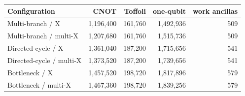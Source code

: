 \begin{tabular}{lrrrr}
\toprule
Configuration & CNOT & Toffoli & one-qubit & work ancillas \\
\midrule
Multi-branch / X & 1{,}196{,}400 & 161{,}760 & 1{,}492{,}936 & 509 \\
Multi-branch / multi-X & 1{,}207{,}680 & 161{,}760 & 1{,}515{,}736 & 509 \\
Directed-cycle / X & 1{,}361{,}040 & 187{,}200 & 1{,}715{,}656 & 541 \\
Directed-cycle / multi-X & 1{,}373{,}520 & 187{,}200 & 1{,}739{,}656 & 541 \\
Bottleneck / X & 1{,}457{,}520 & 198{,}720 & 1{,}817{,}896 & 579 \\
Bottleneck / multi-X & 1{,}467{,}360 & 198{,}720 & 1{,}839{,}256 & 579 \\
\bottomrule
\end{tabular}

